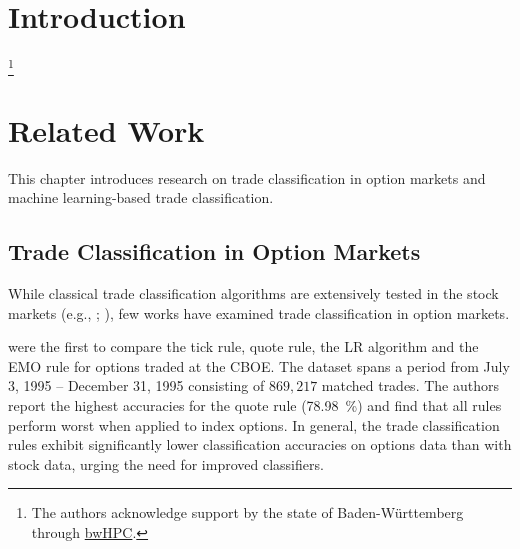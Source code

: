 
\section{Introduction}\label{sec:introduction}


\footnote{The authors acknowledge support by the state of Baden-Württemberg through \href{https://www.bwhpc.de/}{bwHPC}.}
\newpage

\section{Related Work}\label{sec:related-work}

This chapter introduces research on trade classification in option markets and machine learning-based trade classification.

\subsection{Trade Classification in Option Markets}
\label{sec:trade-classification-in-option-markets}

While classical trade classification algorithms are extensively tested in the stock markets (e.g., \textcite[][3806--3821]{chakrabartyTradeClassificationAlgorithms2012}; \textcite[][259--286]{odders-whiteOccurrenceConsequencesInaccurate2000}), few works have examined trade classification in option markets.

\textcite[882--883]{savickasInferringDirectionOption2003} were the first to compare the tick rule, quote rule, the \gls{LR} algorithm and the \gls{EMO} rule for options traded at the \gls{CBOE}. The dataset spans a period from July 3, 1995 -- December 31, 1995 consisting of $869{,}217$ matched trades. The authors report the highest accuracies for the quote rule (\SI{78.98}{\percent}) and find that all rules perform worst when applied to index options. In general, the trade classification rules exhibit significantly lower classification accuracies on options data than with stock data, urging the need for improved classifiers.

